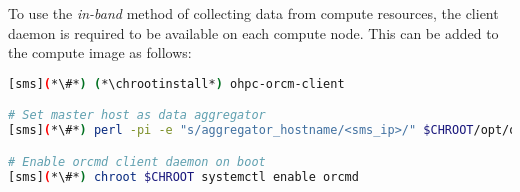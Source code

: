 To use the {\em in-band} method of collecting data from compute resources, the
\ORCM{} client daemon is required to be available on each compute node. This can
be added to the compute image as follows:

\begin{lstlisting}[language=bash,keywords={},upquote=true]
[sms](*\#*) (*\chrootinstall*) ohpc-orcm-client

# Set master host as data aggregator
[sms](*\#*) perl -pi -e "s/aggregator_hostname/<sms_ip>/" $CHROOT/opt/open-rcm/etc/orcm-site.xml

# Enable orcmd client daemon on boot
[sms](*\#*) chroot $CHROOT systemctl enable orcmd
\end{lstlisting}
